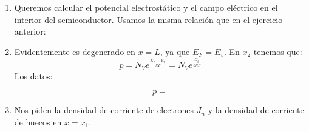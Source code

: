 	\begin{enumerate}[label=\alph*)]
		\item Queremos calcular el potencial electrostático y el campo eléctrico en el interior del semiconductor. Usamos la misma relación que en el ejercicio anterior:
		\item  Evidentemente es degenerado en $x=L$, ya que $E_F=E_v$. En $x_2$ tenemos que:
		\begin{equation}
			p = N_V e^{\frac{E_F-E_v}{kT}} = N_V e^{\frac{E_g}{3kT}}
		\end{equation}
		Los datos:

		\begin{equation}
			p =
		\end{equation}
		\item Nos piden la densidad de corriente de electrones $J_n$ y la densidad de corriente de huecos en $x=x_1$.
	\end{enumerate}
